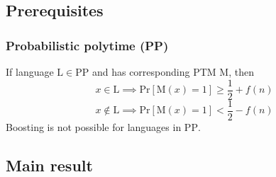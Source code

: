 \documentclass[../main.tex]{subfiles}
\begin{document}
\subsection{Prerequisites}

\subsubsection{Probabilistic polytime (PP)}

\noindent If language $\mathrm{L} \in \mathrm{PP}$ and has corresponding PTM $\mathrm{M}$, then 
\begin{equation*}
    x \in \mathrm{L} \implies \mathrm{Pr}[\mathrm{M}(x) = 1] \ge \frac{1}{2} + f(n)
\end{equation*}
\begin{equation*}
    x \not\in \mathrm{L} \implies \mathrm{Pr}[\mathrm{M}(x) = 1] < \frac{1}{2} - f(n)
\end{equation*}
Boosting is not possible for languages in $\mathrm{PP}$.

\subsection{Main result}
\end{document}
